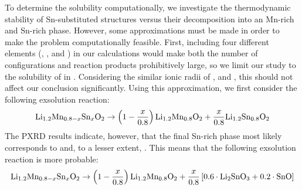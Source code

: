\begin{refsection}
To determine the  solubility computationally, we investigate the 
thermodynamic stability of Sn-substituted structures versus their 
decomposition into an Mn-rich and Sn-rich phase. However, some approximations 
must be made in order to make the problem computationally feasible. First, 
including four different elements (, ,  and ) in 
our calculations would make both the number of configurations and reaction 
products prohibitively large, so we limit our study to the solubility of 
 in . Considering the similar ionic radii of 
,  and , this should not affect our 
conclusion significantly. Using this approximation, we first consider the 
following exsolution reaction: 
\begin{equation} 
 \ce{Li_{1.2}Mn_{0.8-x}Sn_xO2} \rightarrow  \left( 1 - \frac{x}{0.8} \right) 
\ce{Li_{1.2}Mn_{0.8}O2} +  \frac{x}{0.8} \ce{Li_{1.2}Sn_{0.8}O2}  
\end{equation} 
The \gls{PXRD} results indicate, however, that the final Sn-rich phase most likely 
corresponds to  and, to a lesser extent, . This means that 
the following exsolution reaction is more probable: 
\begin{equation} \label{batteries:eq-exsolution} 
 \ce{Li_{1.2}Mn_{0.8-x}Sn_xO2} \rightarrow  \left( 1 - \frac{x}{0.8} \right) 
\ce{Li_{1.2}Mn_{0.8}O2} +  \frac{x}{0.8} \left[  0.6 \cdot \ce{Li2SnO3} + 0.2 
\cdot \ce{SnO} \right] 
\end{equation} 
 

\end{refsection}
